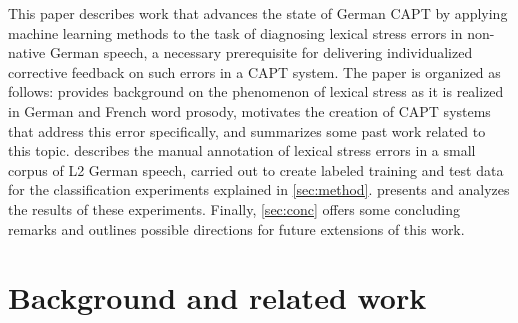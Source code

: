 \documentclass[a4paper]{article}
\begin{document}
  This paper describes work that advances the state of German CAPT by applying machine learning methods to the task of diagnosing lexical stress errors in non-native German speech, a necessary prerequisite for delivering individualized corrective feedback on such errors in a CAPT system. The paper is organized as follows:  provides background on the phenomenon of lexical stress as it is realized in German and French word prosody, motivates the creation of CAPT systems that address this error specifically, and summarizes some past work related to this topic.  describes the manual annotation of lexical stress errors in a small corpus of L2 German speech, carried out to create labeled training and test data for the classification experiments explained in \cref{sec:method}.  presents and analyzes the results of these experiments. Finally, \cref{sec:conc} offers some concluding remarks and outlines possible directions for future extensions of this work.
  
  


	\section{Background and related work}
	\label{sec:bkgd}
	
\end{document}

